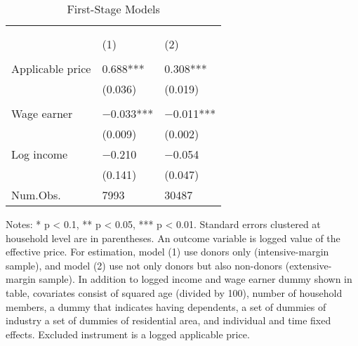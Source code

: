\begin{table}

\caption{First-Stage Models\label{tab:main-stage1}}
\centering
\fontsize{8}{10}\selectfont
\begin{threeparttable}
\begin{tabular}[t]{l>{\centering\arraybackslash}p{18.75em}>{\centering\arraybackslash}p{18.75em}}
\toprule
\multicolumn{1}{c}{ } & \multicolumn{2}{c}{Effective price} \\
\cmidrule(l{3pt}r{3pt}){2-3}
\multicolumn{1}{c}{ } & \multicolumn{1}{c}{Donors (Intensive-margin)} & \multicolumn{1}{c}{Donors and Non-donors (Extensive-margin)} \\
\cmidrule(l{3pt}r{3pt}){2-2} \cmidrule(l{3pt}r{3pt}){3-3}
  & (1) & (2)\\
\midrule
\addlinespace[0.3em]
\multicolumn{3}{l}{\textit{Excluded instruments}}\\
\hspace{1em}Applicable price & \num{0.688}*** & \num{0.308}***\\
\hspace{1em} & (\num{0.036}) & (\num{0.019})\\
\addlinespace[0.3em]
\multicolumn{3}{l}{\textit{Covariates}}\\
\hspace{1em}Wage earner & \num{-0.033}*** & \num{-0.011}***\\
\hspace{1em} & (\num{0.009}) & (\num{0.002})\\
\hspace{1em}Log income & \num{-0.210} & \num{-0.054}\\
\hspace{1em} & (\num{0.141}) & (\num{0.047})\\
\midrule
Num.Obs. & \num{7993} & \num{30487}\\
\bottomrule
\end{tabular}
\begin{tablenotes}
\item Notes: * p < 0.1, ** p < 0.05, *** p < 0.01. Standard errors clustered at household level are in parentheses. An outcome variable is logged value of the effective price. For estimation, model (1) use donors only (intensive-margin sample), and model (2) use not only donors but also non-donors (extensive-margin sample). In addition to logged income and wage earner dummy shown in table, covariates consist of squared age (divided by 100), number of household members, a dummy that indicates having dependents, a set of dummies of industry a set of dummies of residential area, and individual and time fixed effects. Excluded instrument is a logged applicable price.
\end{tablenotes}
\end{threeparttable}
\end{table}
